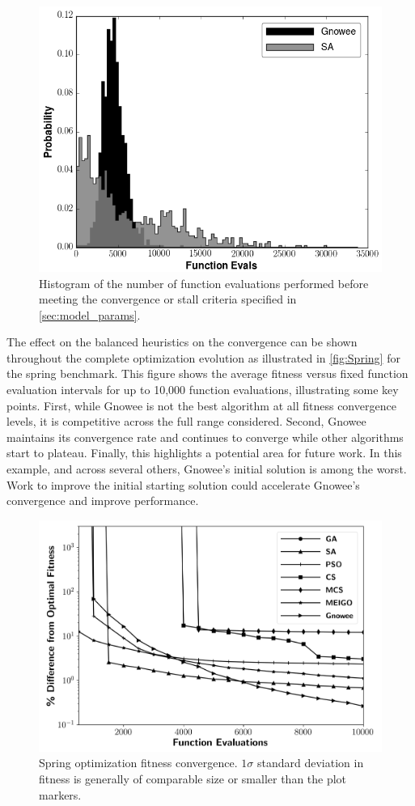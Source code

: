 \documentclass{article}                                                                           %
\begin{document}
\begin{figure}[!t]
  \centering
  \includegraphics[width=4.5in]{Spring_hist}
  \caption{Histogram of the number of function evaluations performed before meeting the convergence or stall criteria specified in \autoref{sec:model_params}.}
  \label{fig:Spring_hist}
\end{figure}


The effect on the balanced heuristics on the convergence can be shown throughout the complete optimization evolution as illustrated in  \autoref{fig:Spring} for the spring benchmark.
This figure shows the average fitness versus fixed function evaluation intervals for up to 10,000 function evaluations, illustrating some key points.
First, while Gnowee is not the best algorithm at all fitness convergence levels, it is competitive across the full range considered.
Second, Gnowee maintains its convergence rate and continues to converge while other algorithms start to plateau.
Finally, this highlights a potential area for future work.
In this example, and across several others, Gnowee's initial solution is among the worst.
Work to improve the initial starting solution could accelerate Gnowee's convergence and improve performance.

\begin{figure}[!t]
  \centering
  \includegraphics[width=4.5in]{Spring}
  \caption{Spring optimization fitness convergence. $1\sigma$ standard deviation in fitness is generally of comparable size or smaller than the plot markers.}
  \label{fig:Spring}
\end{figure}
\end{document}
